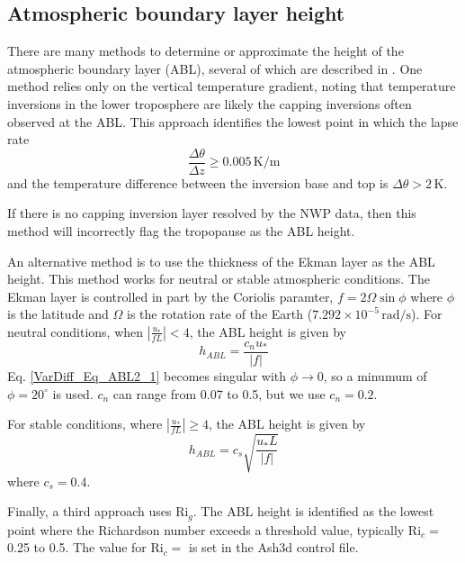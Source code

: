 \subsection{Atmospheric boundary layer height}

There are many methods to determine or approximate the height of the atmospheric boundary
layer (ABL), several of which are described in \cite{Sugiyama1999}. One method relies only on the
vertical temperature gradient, noting that temperature inversions in the lower troposphere
are likely the capping inversions often observed at the ABL. This
approach identifies the lowest point in which the lapse rate
\begin{equation}\label{VarDiff_Eq_ABL1}
\frac{\Delta \theta}{\Delta z} \ge 0.005 \, \mathrm{K} / \mathrm{m}
\end{equation}
and the temperature difference between the inversion base and top
is $\Delta \theta > 2 \, \mathrm{K}$.

If there is no capping inversion layer resolved by the NWP data, then this method
will incorrectly flag the tropopause as the ABL height.

An alternative method is to use the thickness of the Ekman layer as the ABL height.
This method works for neutral or stable atmospheric conditions. The Ekman layer is
controlled in part by the Coriolis paramter, $f=2 \Omega \sin \phi$ where $\phi$
is the latitude and $\Omega$ is the rotation rate of the Earth
($7.292 \times 10^{-5} \, \mathrm{rad/s}$).  For neutral conditions,
when $\left| \frac{u_*}{f L}\right| < 4$, the ABL height is given by
\begin{equation}\label{VarDiff_Eq_ABL2_1}
h_{ABL} = \frac{c_n u_*}{|f|}
\end{equation}
Eq. \ref{VarDiff_Eq_ABL2_1} becomes singular with $\phi \rightarrow 0$, so a minumum
of $\phi=20^{\circ}$ is used. $c_n$ can range from 0.07 to 0.5, but we use $c_n=0.2$.

For stable conditions, where $\left| \frac{u_*}{f L}\right| \ge 4$, the ABL height is given by
\begin{equation}\label{VarDiff_Eq_ABL2_2}
h_{ABL} = c_s \sqrt{\frac{u_* L}{|f|}}
\end{equation}
where $c_s=0.4$.

Finally, a third approach uses $\mathrm{Ri}_g$. The ABL height is identified as the
lowest point where the Richardson number exceeds a threshold value, typically $\mathrm{Ri}_c=$ 0.25 to
0.5. The value for $\mathrm{Ri}_c=$ is set in the Ash3d control file.

